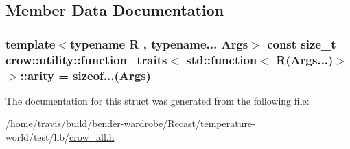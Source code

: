 \subsection{Member Data Documentation}
\hypertarget{structcrow_1_1utility_1_1function__traits_3_01std_1_1function_3_01_r_07_args_8_8_8_08_4_01_4_a70516b9f70d408ea0bae3b62913c7976}{
\subsubsection[{arity}]{\setlength{\rightskip}{0pt plus 5cm}template$<$typename R , typename... Args$>$ const size\-\_\-t {\bf crow\-::utility\-::function\-\_\-traits}$<$ std\-::function$<$ R(Args...)$>$ $>$\-::arity = sizeof...(Args)\hspace{0.3cm}{\ttfamily [static]}}}\label{structcrow_1_1utility_1_1function__traits_3_01std_1_1function_3_01_r_07_args_8_8_8_08_4_01_4_a70516b9f70d408ea0bae3b62913c7976}


The documentation for this struct was generated from the following file\-:\begin{DoxyCompactItemize}
\item 
/home/travis/build/bender-\/wardrobe/\-Recast/temperature-\/world/test/lib/\hyperlink{crow__all_8h}{crow\-\_\-all.\-h}\end{DoxyCompactItemize}
